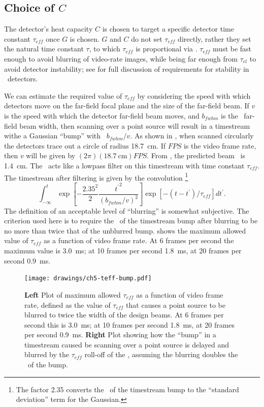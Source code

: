 \subsection{Choice of $C$}

The detector's heat capacity $C$ is chosen to target a specific detector time constant $\tau_{eff}$ once $G$ is chosen.
$G$ and $C$ do not set $\tau_{eff}$ directly, rather they set the natural time constant $\tau$, to which $\tau_{eff}$ is proportional via .
$\tau_{eff}$ must be fast enough to avoid blurring of video-rate images, while being far enough from $\tau_{el}$ to avoid detector instability; see  \cite{irwin_transition-edge_2005} for full discussion of requirements for stability in \TES\ detectors.

We can estimate the required value of $\tau_{eff}$ by considering the speed with which detectors move on the far-field focal plane and the size of the far-field beam.
If $v$ is the speed with which the detector far-field beam moves, and $b_{fwhm}$ is the \FWHM\ far-field beam width, then scanning over a point source will result in a timestream withe a Gaussian ``bump'' with \FWHM\ $b_{fwhm} / v$.
As shown in , when scanned circularly the detectors trace out a circle of radius \SI{18.7}{\cm}.
If $FPS$ is the video frame rate, then $v$ will be given by $(2 \pi)(\SI{18.7}{\cm}) FPS$.
From , the predicted beam \FWHM\ is \SI{1.4}{\cm}.
The \TES\ acts like a lowpass filter on this timestream with time constant $\tau_{eff}$.
The timestream after filtering is given by the convolution%
\footnote{The factor 2.35 converts the \FWHM\ of the timestream bump to the ``standard deviation'' term for the Gaussian.}
\begin{equation}
  \int_{-\infty}^{t} \exp{\left[-\frac{2.35^2}{2} \frac{{t^{\prime}}^2}{(b_{fwhm}/v)^2}\right]}
       \exp{\left[-(t-t^{\prime})/\tau_{eff}\right]} dt^{\prime}.
\end{equation}
The definition of an acceptable level of ``blurring'' is somewhat subjective.
The criterion used here is to require the \FWHM\ of the timestream bump after blurring to be no more than twice that of the unblurred bump.
 shows the maximum allowed value of $\tau_{eff}$ as a function of video frame rate.
At 6 frames per second the maximum value is \SI{3.0}{\ms}; at 10 frames per second \SI{1.8}{\ms}, at 20 frames per second \SI{0.9}{\ms}.

\begin{figure}
\centering
\texttt{[image: drawings/ch5-teff-bump.pdf]}
\caption[Maximum $\tau_{eff}$ for no blurring]{
  \textbf{Left} Plot of maximum allowed $\tau_{eff}$ as a function of video frame rate, defined as the value of $\tau_{eff}$ that causes a point source to be blurred to twice the width of the design beams.
  At 6 frames per second this is \SI{3.0}{\ms}; at 10 frames per second \SI{1.8}{\ms}, at 20 frames per second \SI{0.9}{\ms}.
  \textbf{Right} Plot showing how the ``bump'' in a timestream caused be scanning over a point source is delayed and blurred by the $\tau_{eff}$ roll-off of the \TES, assuming the blurring doubles the \FWHM\ of the bump.
}
\label{fig:ch5-teff-bump}
\end{figure}

